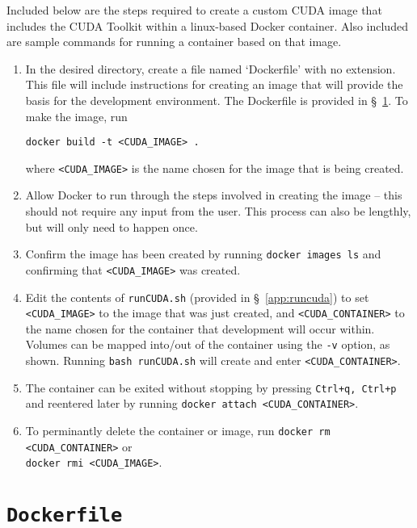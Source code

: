 \documentclass[11pt,letterpaper]{article}
\begin{document}
Included below are the steps required to create a custom CUDA image that includes
the CUDA Toolkit within a linux-based Docker container. Also included are sample commands for running
a container based on that image.

\begin{enumerate}
  \item In the desired directory, create a file named `Dockerfile' with no extension. This file
  will include instructions for creating an image that will provide the basis for the development
  environment. The Dockerfile is provided in \S~\!\ref{app:dockerfile}. To make the image, run
  \begin{center}
    \verb+docker build -t <CUDA_IMAGE> .+
  \end{center}
  where \verb+<CUDA_IMAGE>+ is the name chosen for the image that is being created.
  \item Allow Docker to run through the steps involved in creating the image -- this should not require
  any input from the user. This process can also be lengthly, but will only need to happen once.
  \item Confirm the image has been created by running \verb+docker images ls+ and confirming that
  \verb+<CUDA_IMAGE>+ was created. 
  \item Edit the contents of \texttt{runCUDA.sh} (provided in \S~\!\ref{app:runcuda}) to set \verb+<CUDA_IMAGE>+ to the image that
  was just created, and \verb+<CUDA_CONTAINER>+ to the name chosen for the container that development
  will occur within. Volumes can be mapped into/out of the container using the \texttt{-v} option, as shown. Running 
  \texttt{bash runCUDA.sh} will create and enter \verb+<CUDA_CONTAINER>+.
  \item The container can be exited without stopping by pressing \texttt{Ctrl+q, Ctrl+p} and reentered 
  later by running \verb+docker attach <CUDA_CONTAINER>+.
  \item To perminantly delete the container or image, run \verb+docker rm <CUDA_CONTAINER>+
  or \\\verb+docker rmi <CUDA_IMAGE>+.
\end{enumerate}




\section{\texttt{Dockerfile}}
\label{app:dockerfile}
\end{document}
